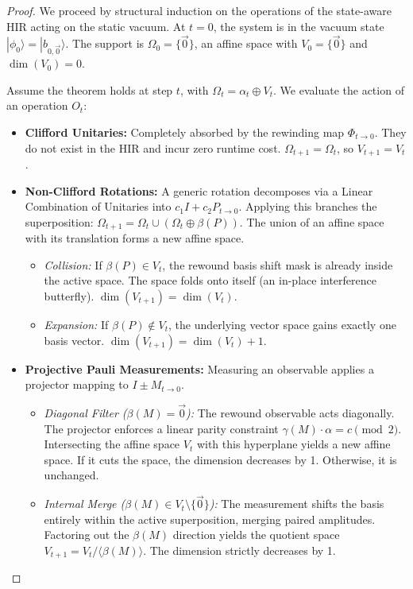 \documentclass[aps,prx,reprint,superscriptaddress,nofootinbib]{revtex4-2}
\theoremstyle{definition}
\begin{document}
\begin{proof}
We proceed by structural induction on the operations of the state-aware HIR acting on the static vacuum. At $t=0$, the system is in the vacuum state $|\phi_0\rangle = |b_{0,\vec{0}}\rangle$. The support is $\Omega_0 = \{\vec{0}\}$, an affine space with $V_0 = \{\vec{0}\}$ and $\dim(V_0) = 0$.

Assume the theorem holds at step $t$, with $\Omega_t = \alpha_t \oplus V_t$. We evaluate the action of an operation $O_t$:
\begin{itemize}[leftmargin=*]
    \item \textbf{Clifford Unitaries:} Completely absorbed by the rewinding map $\Phi_{t \to 0}$. They do not exist in the HIR and incur zero runtime cost. $\Omega_{t+1} = \Omega_t$, so $V_{t+1} = V_t$.
    \item \textbf{Non-Clifford Rotations:} A generic rotation decomposes via a Linear Combination of Unitaries into $c_1 I + c_2 P_{t \to 0}$. Applying this branches the superposition: $\Omega_{t+1} = \Omega_t \cup (\Omega_t \oplus \beta(P))$. The union of an affine space with its translation forms a new affine space.
    \begin{itemize}
        \item \textit{Collision:} If $\beta(P) \in V_t$, the rewound basis shift mask is already inside the active space. The space folds onto itself (an in-place interference butterfly). $\dim(V_{t+1}) = \dim(V_t)$.
        \item \textit{Expansion:} If $\beta(P) \notin V_t$, the underlying vector space gains exactly one basis vector. $\dim(V_{t+1}) = \dim(V_t) + 1$.
    \end{itemize}
    \item \textbf{Projective Pauli Measurements:} Measuring an observable applies a projector mapping to $I \pm M_{t\to0}$.
    \begin{itemize}
        \item \textit{Diagonal Filter ($\beta(M) = \vec{0}$):} The rewound observable acts diagonally. The projector enforces a linear parity constraint $\gamma(M) \cdot \alpha = c \pmod 2$. Intersecting the affine space $V_t$ with this hyperplane yields a new affine space. If it cuts the space, the dimension decreases by 1. Otherwise, it is unchanged.
        \item \textit{Internal Merge ($\beta(M) \in V_t \setminus \{\vec{0}\}$):} The measurement shifts the basis entirely within the active superposition, merging paired amplitudes. Factoring out the $\beta(M)$ direction yields the quotient space $V_{t+1} = V_t / \langle \beta(M) \rangle$. The dimension strictly decreases by 1.

\end{itemize}
\end{itemize}
\end{proof}
\end{document}
